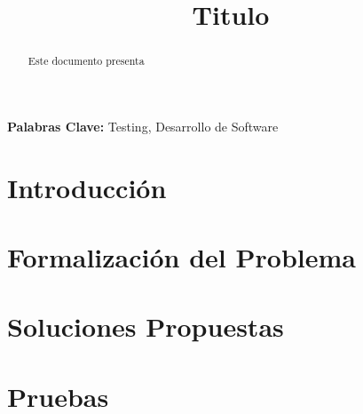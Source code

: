 \documentclass[conference]{IEEEtran}
\title{Titulo}
\author{
\IEEEauthorblockN{
Rodrigo G. Fernández\IEEEauthorrefmark{1}
}
\IEEEauthorblockA{
\IEEEauthorrefmark{1}Computer Systems Research Group~\cite{CSRG}, Universidad Técnica Federico Santa María, Av. ~España~1680, Valparaíso, Chile
}
}
\begin{document}

\pagestyle{empty}

\maketitle\thispagestyle{empty}

\begin{abstract}
Este documento presenta
\end{abstract}

\textbf{Palabras Clave:} Testing, Desarrollo de Software

\section{Introducción}
\label{sec:intro}


\section{Formalización del Problema}
\label{sec:formalizacion}


\section{Soluciones Propuestas}
\label{sec:solucion}


\section{Pruebas}
\label{sec:pruebas}

\end{document}
